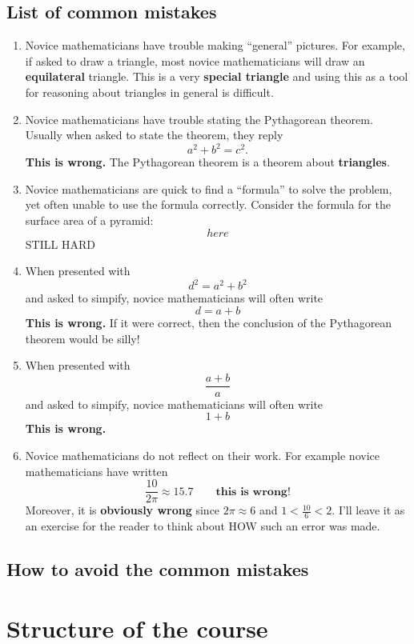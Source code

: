 \documentclass[handout,nooutcomes,noauthor]{ximera}
\begin{document}
\subsection{List of common mistakes}
\begin{enumerate}
\item Novice mathematicians have trouble making ``general''
  pictures. For example, if asked to draw a triangle, most novice
  mathematicians will draw an \textbf{equilateral} triangle. This is a
  very \textbf{special triangle} and using this as a tool for
  reasoning about triangles in general is difficult.
\item Novice mathematicians have trouble stating the Pythagorean
  theorem. Usually when asked to state the theorem, they reply
  \[
  a^2+b^2=c^2.
  \]
  \textbf{This is wrong.} The Pythagorean theorem is a theorem
  about \textbf{triangles}. 
\item Novice mathematicians are quick to find a ``formula'' to solve
  the problem, yet often unable to use the formula correctly. Consider
  the formula for the surface area of a pyramid:
  \[
  here
  \]
  STILL HARD
\item When presented with
  \[
  d^2 = a^2 + b^2
  \]
  and asked to simpify, novice mathematicians will often write
  \[
  d = a +b
  \]
  \textbf{This is wrong.} If it were correct, then the
  conclusion of the Pythagorean theorem would be silly!
\item  When presented with
  \[
  \frac{a + b}{a}
  \]
  and asked to simpify, novice mathematicians will often write
  \[
  1+b
  \]
  \textbf{This is wrong.}
\item Novice mathematicians do not reflect on their work. For example
  novice mathematicians have written
  \[
  \frac{10}{2\pi} \approx  15.7\qquad\textbf{this is wrong!}
  \]
  Moreover, it is \textbf{obviously wrong} since $2\pi\approx 6$ and
  $1<\frac{10}{6} <2$. I'll leave it as an exercise for the reader to
  think about HOW such an error was made.
\end{enumerate}


\subsection{How to avoid the common mistakes}





\section{Structure of the course}
\end{document}
